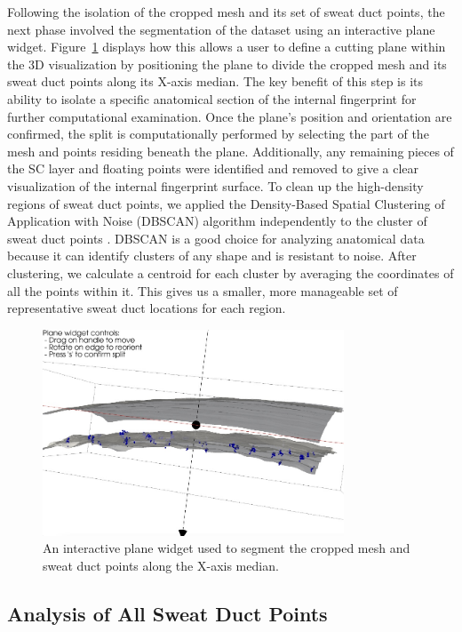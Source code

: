 Following the isolation of the cropped mesh and its set of sweat duct points, the next phase involved the segmentation of the dataset using an interactive plane widget. Figure~\ref{fig:cutting_plane} displays how this allows a user to define a cutting plane within the 3D visualization by positioning the plane to divide the cropped mesh and its sweat duct points along its X-axis median. The key benefit of this step is its ability to isolate a specific anatomical section of the internal fingerprint for further computational examination. Once the plane's position and orientation are confirmed, the split is computationally performed by selecting the part of the mesh and points residing beneath the plane. Additionally, any remaining pieces of the SC layer and floating points were identified and removed to give a clear visualization of the internal fingerprint surface. To clean up the high-density regions of sweat duct points, we applied the Density-Based Spatial Clustering of Application with Noise (DBSCAN) algorithm independently to the cluster of sweat duct points \parencite{esterDensityBasedAlgorithmDiscovering}. DBSCAN is a good choice for analyzing anatomical data because it can identify clusters of any shape and is resistant to noise. After clustering, we calculate a centroid for each cluster by averaging the coordinates of all the points within it. This gives us a smaller, more manageable set of representative sweat duct locations for each region.
\begin{figure}[h!]
    \centering
    \includegraphics[width=0.8\textwidth]{images/Mesh_Splitting.jpg}
    \caption{An interactive plane widget used to segment the cropped mesh and sweat duct points along the X-axis median.}
    \label{fig:cutting_plane}
\end{figure}
\subsection{Analysis of All Sweat Duct Points}

